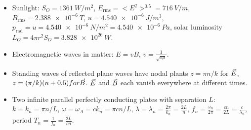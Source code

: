 \begin{itemize}
	\item Sunlight: $S_O = \SI{1361}{W/m^2}$, $E_\text{rms} = <E^2>^{0.5} = \SI{716}{V/m}$, $B_\text{rms} = \SI{2.388e-6}{T}$, $u = \SI{4.540e-6}{J/m^3}$, $p_\text{rad} = u = \SI{4.540e-6}{N/m^2} = \SI{4.540e-6}{Pa}$, solar luminosity $L_O = 4\pi r^2S_O = \SI{3.828e26}{W}$.
	
	\item Electromagnetic waves in matter: $E = vB$, $v = \frac{1}{\sqrt{\varepsilon\mu}}$.
	
	\item Standing waves of reflected plane waves have nodal plants $z = \pi n/k$ for $\vec{E}$, $z = (\pi/k)(n+0.5) for \vec{B}$. $\vec{E}$ and $\vec{B}$ each vanish everywhere at different times.
	
	\item Two infinite parallel perfectly conducting plates with separation $L$: $k = k_n = \pi n/L$, $\omega = \omega_A = ck_n = \pi c n/L$, $\lambda = \lambda_n = \frac{2\pi}{k_n} = \frac{2L}{n}$, $f_n = \frac{\omega_n}{2\pi} = \frac{cn}{2L} = \frac{c}{\lambda_n}$, period $T_n = \frac{1}{f_n} = \frac{2L}{cn}$.
\end{itemize}